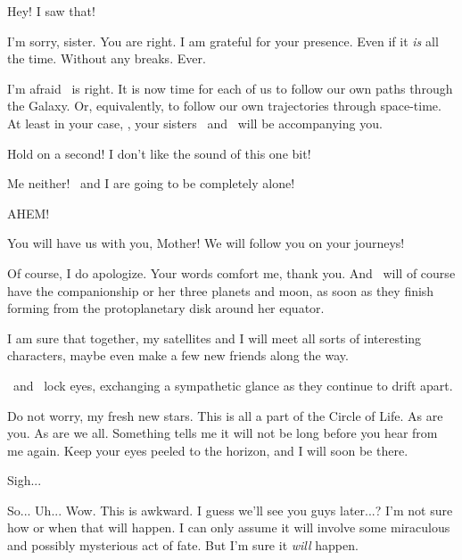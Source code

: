 \documentclass[main.tex]{subfiles}
\begin{document}
\par \Taygete Hey!  I saw that!

\par \Alcyone I'm sorry, sister.  You are right.  I am grateful for your presence.  Even if it \textit{is} all the time.  Without any breaks.  Ever.

\par \Maia I'm afraid \rmalcyone~is right.  It is now time for each of us to follow our own paths through the Galaxy.  Or, equivalently, to follow our own trajectories through space-time.  At least in your case, \rmtaygete, your sisters \rmalcyone~and \rmcelaeno~will be accompanying you.

\par \Electra Hold on a second!  I don't like the sound of this one bit!

\par \Sterope Me neither! \rmelectra~and I are going to be completely alone!

\par \Alphab AHEM!

\par \Betab You will have us with you, Mother!  We will follow you on your journeys!

\par \Sterope Of course, I do apologize.  Your words comfort me, thank you.  And \rmelectra~will of course have the companionship or her three planets and moon, as soon as they finish forming from the protoplanetary disk around her equator.

\par \Electra I am sure that together, my satellites and I will meet all sorts of interesting characters, maybe even make a few new friends along the way.  

\par \nar \rmsterope~and \rmelectra~lock eyes, exchanging a sympathetic glance as they continue to drift apart.  

\par \Maia Do not worry, my fresh new stars. This is all a part of the Circle of Life.  As are you.  As are we all.  Something tells me it will not be long before you hear from me again. Keep your eyes peeled to the horizon, and I will soon be there.  

\par \Electra Sigh...  

\par \Taygete So... Uh... Wow.  This is awkward.  I guess we'll see you guys later...? I'm not sure how or when that will happen.  I can only assume it will involve some miraculous and possibly mysterious act of fate.  But I'm sure it \textit{will} happen.
  
\end{document}
